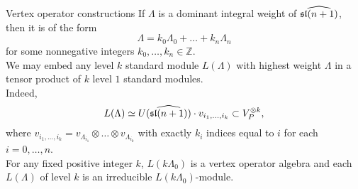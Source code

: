 \documentclass{beamer}
\begin{document}
\begin{frame}{Vertex operator constructions}
If $\Lambda$ is a dominant integral weight of $\widehat{\frak{sl}(n+1)}$, then it is of the form
$$\Lambda = k_0 \Lambda_0 + \dots + k_n \Lambda_n$$
for some nonnegative integers $k_0,\dots ,k_n \in \mathbb{Z}$.\\
\vspace{0.1in}
\pause
We may embed any level $k$ standard module $L(\Lambda)$ with highest weight $\Lambda$ in a tensor product of $k$ level $1$ standard modules.\\
\vspace{0.1in}
\pause
Indeed, 
$$L(\Lambda) \simeq U(\widehat{\frak{sl}(n+1)})\cdot v_{i_1,\dots,i_k} \subset V_P^{\otimes k},$$
where $v_{i_1,\dots,i_k} = v_{\Lambda_{i_1}} \otimes \dots \otimes v_{\Lambda_{i_k}}$ with exactly $k_i$ indices equal to $i$ for each $i=0,\dots ,n $. \\
\pause
\vspace{0.1in}
For any fixed positive integer $k$, $L(k\Lambda_0)$ is a vertex operator algebra and
each $L(\Lambda)$ of level $k$ is an irreducible $L(k\Lambda_0)$-module. 
\end{frame}




\end{document}
